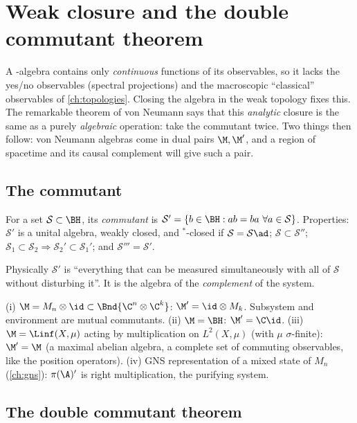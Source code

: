 \chapter{Weak closure and the double commutant theorem}\label{ch:doublecomm}

\begin{physmotiv}
A \cstar-algebra contains only \emph{continuous} functions of its observables, so it lacks the yes/no observables (spectral projections) and the macroscopic ``classical'' observables of \cref{ch:topologies}. Closing the algebra in the weak topology fixes this. The remarkable theorem of von Neumann says that this \emph{analytic} closure is the same as a purely \emph{algebraic} operation: take the commutant twice. Two things then follow: von Neumann algebras come in dual pairs $\M,\M'$, and a region of spacetime and its causal complement will give such a pair.
\end{physmotiv}

\section{The commutant}

For a set $\mathcal S\subset\BH$, its \emph{commutant} is $\mathcal S'=\{b\in\BH:ab=ba\ \forall a\in\mathcal S\}$. Properties: $\mathcal S'$ is a unital algebra, weakly closed, and $^*$-closed if $\mathcal S=\mathcal S\ad$; $\mathcal S\subset\mathcal S''$; $\mathcal S_1\subset\mathcal S_2\Rightarrow\mathcal S_2'\subset\mathcal S_1'$; and $\mathcal S'''=\mathcal S'$.

Physically $\mathcal S'$ is ``everything that can be measured simultaneously with all of $\mathcal S$ without disturbing it''. It is the algebra of the \emph{complement} of the system.

\begin{example}
(i) $\M=M_n\otimes\id\subset\Bnd{\C^n\otimes\C^k}$: $\M'=\id\otimes M_k$. Subsystem and environment are mutual commutants. (ii) $\M=\BH$: $\M'=\C\id$. (iii) $\M=\Linf(X,\mu)$ acting by multiplication on $L^2(X,\mu)$ (with $\mu$ $\sigma$-finite): $\M'=\M$ (a maximal abelian algebra, a complete set of commuting observables, like the position operators). (iv) GNS representation of a mixed state of $M_n$ (\cref{ch:gns}): $\pi(\A)'$ is right multiplication, the purifying system.
\end{example}

\section{The double commutant theorem}

